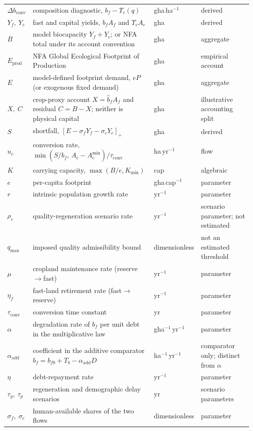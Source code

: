 \documentclass[11pt,a4paper]{article}
\newcommand{\pos}[1]{\left[#1\right]_+}
\newcommand{\dconv}{\Delta b_{\mathrm{conv}}}
\newcommand{\Ups}{\Upsilon_c}
\newcommand{\Acmin}{A_c^{\min}}
\newcommand{\tconv}{\tau_{\mathrm{conv}}}
\begin{document}
\begin{longtable}{>{\raggedright\arraybackslash}p{}>{\raggedright\arraybackslash}p{}>{\raggedright\arraybackslash}p{}>{\raggedright\arraybackslash}p{}}
$\dconv$ & composition diagnostic, $b_f-\Ups(q)$ & gha\,ha$^{-1}$ & derived \\
$Y_f,\ Y_c$ & fast and capital yields, $b_fA_f$ and $\Ups A_c$ & gha & derived \\
$B$ & model biocapacity $Y_f+Y_c$; or NFA total under its account convention & gha & aggregate \\
$E_{\mathrm{prod}}$ & NFA Global Ecological Footprint of Production & gha & empirical account \\
$E$ & model-defined footprint demand, $eP$ (or exogenous fixed demand) & gha & aggregate \\
$X,\ C$ & crop-proxy account $X=\hat b_fA_f$ and residual $C=B-X$; neither is physical capital & gha & illustrative accounting split \\
$S$ & shortfall, $\pos{E-\sigma_fY_f-\sigma_cY_c}$ & gha & derived \\
$u_c$ & conversion rate, $\min(S/b_f,\,A_c-\Acmin)/\tconv$ & ha\,yr$^{-1}$ & flow \\
$K$ & carrying capacity, $\max(B/e,K_{\min})$ & cap & algebraic \\
$e$ & per-capita footprint & gha\,cap$^{-1}$ & parameter \\
$r$ & intrinsic population growth rate & yr$^{-1}$ & parameter \\
$\rho_c$ & quality-regeneration scenario rate & yr$^{-1}$ & scenario parameter; not estimated \\
$q_{\max}$ & imposed quality admissibility bound & dimensionless & not an estimated threshold \\
$\mu$ & cropland maintenance rate (reserve$\to$fast) & yr$^{-1}$ & parameter \\
$\eta_f$ & fast-land retirement rate (fast$\to$reserve) & yr$^{-1}$ & parameter \\
$\tconv$ & conversion time constant & yr & parameter \\
$\alpha$ & degradation rate of $b_f$ per unit debt in the multiplicative law & gha$^{-1}$\,yr$^{-1}$ & parameter \\
$\alpha_{\mathrm{add}}$ & coefficient in the additive comparator $b_f=b_{f0}+T_b-\alpha_{\mathrm{add}}D$ & ha$^{-1}$\,yr$^{-1}$ & comparator only; distinct from $\alpha$ \\
$\eta$ & debt-repayment rate & yr$^{-1}$ & parameter \\
$\tau_g,\ \tau_p$ & regeneration and demographic delay scenarios & yr & scenario parameters \\
$\sigma_f,\ \sigma_c$ & human-available shares of the two flows & dimensionless & parameter \\

\end{longtable}
\end{document}

